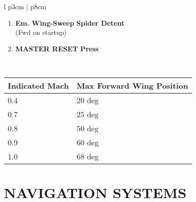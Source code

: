 \documentclass[fontHelvetica]{TechCheck}
\begin{document}
\begin{center}
\begin{longtable}{l p{3cm} | p{8cm}}
\begin{minipage}[t]{\linewidth}
\begin{itemize}
					\begin{enumerate}
						\item \textbf{Em. Wing-Sweep} \dotfill \textbf{Spider Detent} \\
						\hfill (Fwd on startup)
						\item \textbf{MASTER RESET} \dotfill \textbf{Press}
					\end{enumerate}
				\end{itemize}
			\end{minipage} \\
			\bottomrule
		\end{longtable}
	\end{center}
	\begin{center}
		\begin{tabular}{p{3cm} | p{5cm}}
			\toprule
			\textbf{Indicated Mach} & \textbf{Max Forward Wing Position} \\
			\midrule
			0.4 & 20 deg \\
			\midrule
			0.7 & 25 deg \\
			\midrule
			0.8 & 50 deg \\
			\midrule
			0.9 & 60 deg \\
			\midrule
			1.0 & 68 deg \\
			\bottomrule
		\end{tabular}
	\end{center}


	\clearpage

	\section{NAVIGATION SYSTEMS}
\end{document}
